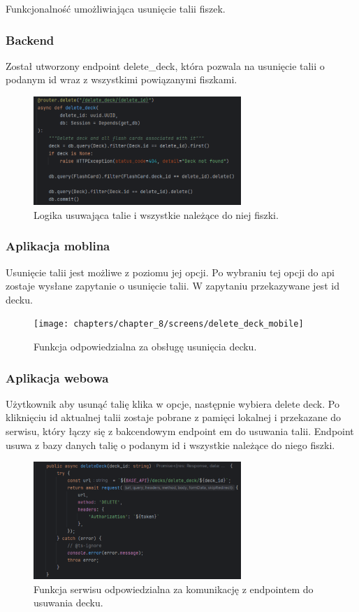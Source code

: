 Funkcjonalność umożliwiająca usunięcie talii fiszek.

\subsubsection{Backend}

Został utworzony endpoint delete_deck, która pozwala na usunięcie talii o podanym id wraz z wszystkimi powiązanymi fiszkami.

\begin{figure}[H]
    \centering
    \includegraphics[width=0.7\textwidth]{chapters/chapter_8/screens/delete_deck_backend}
    \caption{Logika usuwająca talie i wszystkie należące do niej fiszki.}
    \label{img:delete_deck_backend}
\end{figure}


\subsubsection{Aplikacja moblina}
Usunięcie talii jest możliwe z poziomu jej opcji. Po wybraniu tej opcji do api zostaje wysłane zapytanie o usunięcie talii. W zapytaniu przekazywane jest id decku.

\begin{figure}[H]
    \centering
    \texttt{[image: chapters/chapter\_8/screens/delete\_deck\_mobile]}
    \caption{Funkcja odpowiedzialna za obsługę usunięcia decku.}
    \label{img:delete_deck_mobile}
\end{figure}

\subsubsection{Aplikacja webowa}

Użytkownik aby usunąć talię klika w opcje, następnie wybiera delete deck. Po kliknięciu id aktualnej talii zostaje pobrane z pamięci lokalnej i przekazane do serwisu, który łączy się z bakcendowym endpoint em do usuwania talii. Endpoint usuwa z bazy danych talię o podanym id i wszystkie należące do niego fiszki.

\begin{figure}[H]
    \centering
    \includegraphics[width=0.7\textwidth]{chapters/chapter_8/screens/delete_deck_web}
    \caption{Funkcja serwisu odpowiedzialna za komunikację z endpointem do usuwania decku.}
    \label{img:delete_deck_web}
\end{figure}
